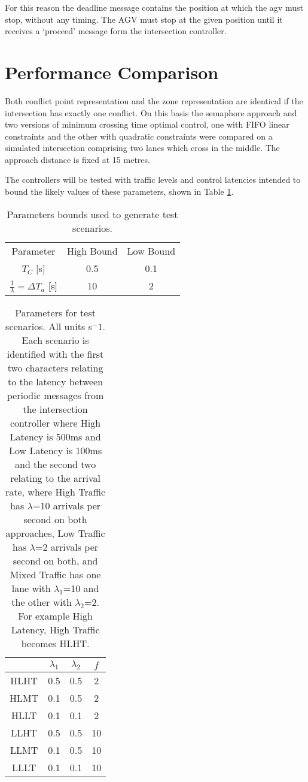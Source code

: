 For this reason the deadline message contains the position at which the agv must stop, without any timing. The AGV must stop at the given position until it receives a `proceed' message form the intersection controller.

\section{Performance Comparison}
Both conflict point representation and the zone representation are identical if the intersection has exactly one conflict. On this basis the semaphore approach and two versions of minimum crossing time optimal control, one with FIFO linear constraints and the other with quadratic constraints were compared on a simulated intersection comprising two lanes which cross in the middle. The approach distance is fixed at 15 metres.

The controllers will be tested with traffic levels and control latencies intended to bound the likely values of these parameters, shown in Table \ref{tab:test_params}.

\begin{table}
	\caption{Parameters bounds used to generate test scenarios.}
	\label{tab:test_params} 
	\centering
	\begin{tabular}{ |c|c|c| }
		\hline
		Parameter & High Bound & Low Bound \\
		$T_C$ [s]& 0.5 & 0.1 \\ 
		$\frac{1}{\lambda}=\Delta T_a$ [s]& 10 & 2 \\ 	
		\hline
	\end{tabular}
\end{table}

\begin{table}
	\begin{tabular}{|c|c|c|c|}
		\hline
		& $\lambda_1$ & $\lambda_2$ & $f$ \\
		\hline
		HLHT & 0.5 & 0.5 & 2 \\
		HLMT & 0.1 & 0.5 & 2 \\
		HLLT & 0.1 & 0.1 & 2 \\
		LLHT & 0.5 & 0.5 & 10 \\
		LLMT & 0.1 & 0.5 & 10 \\
		LLLT & 0.1 & 0.1 & 10 \\
		\hline
	\end{tabular}
	\label{tab:params}
	\caption{Parameters for test scenarios. All units s$^-1$. Each scenario is identified with the first two characters relating to the latency between periodic messages from the intersection controller where High Latency is 500ms and  Low Latency is 100ms and the second two relating to the arrival rate, where High Traffic has $\lambda$=10 arrivals per second on both approaches, Low Traffic has $\lambda$=2 arrivals per second on both, and Mixed Traffic has one lane with $\lambda_1$=10 and the other with $\lambda_2$=2. For example High Latency, High Traffic becomes HLHT.}
\end{table}

